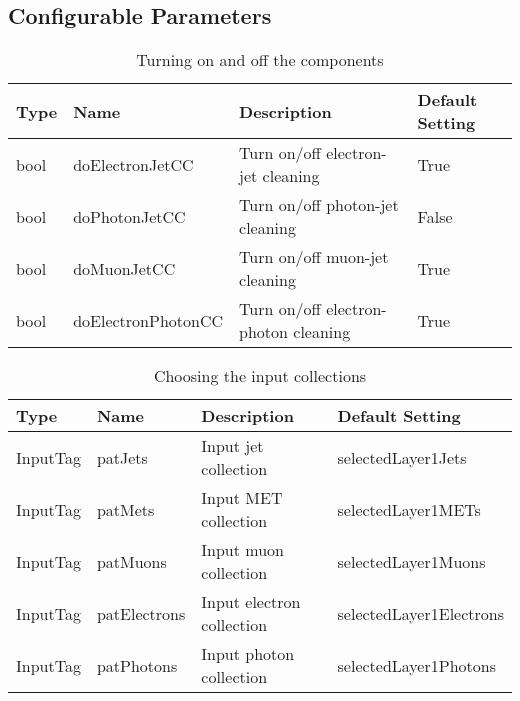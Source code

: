 \documentclass{cmspaper}
\begin{document}
\clearpage
\begin{appendix}
\section{Configurable Parameters}
\begin{table}[h]
\caption{Turning on and off the components}
\begin{center}
\begin{tabular}{l|l|l|l}
\textbf{Type} & \textbf{Name} & \textbf{Description} & \textbf{Default
    Setting} \\ \hline
    bool & doElectronJetCC   & Turn on/off electron-jet cleaning & True
    \\\hline
    bool & doPhotonJetCC     & Turn on/off photon-jet cleaning  & False
    \\\hline
    bool & doMuonJetCC       & Turn on/off muon-jet cleaning     & True
    \\\hline
    bool & doElectronPhotonCC& Turn on/off electron-photon cleaning & True
\end{tabular}
\end{center}
\label{tab:TurnOnModules}
\end{table}

\begin{table}[h]
\caption{Choosing the input collections}
\begin{center}
\begin{tabular}{l|l|l|l}
\textbf{Type} & \textbf{Name} & \textbf{Description} & \textbf{Default
Setting} \\ \hline
InputTag & patJets      & Input jet collection   & selectedLayer1Jets
\\\hline
InputTag & patMets      & Input MET collection   & selectedLayer1METs
\\\hline
InputTag & patMuons     & Input muon collection  & selectedLayer1Muons
\\\hline
InputTag & patElectrons & Input electron collection &
selectedLayer1Electrons 
\\\hline
InputTag & patPhotons   & Input photon collection& selectedLayer1Photons
\end{tabular}
\end{center}
\label{tab:InputCollections}
\end{table}


\end{appendix}
\end{document}
